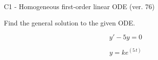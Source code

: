 \begin{exercise}
  \begin{exerciseTitle}C1 - Homogeneous first-order linear ODE (ver. 76)\end{exerciseTitle}
  \begin{exerciseStatement}
    
Find the general solution to the given ODE.

    
\[y'-5y=0\]

  \end{exerciseStatement}
  \begin{exerciseAnswer}
    
\[y= k e^{\left(5 \, t\right)}\]

  \end{exerciseAnswer}
\end{exercise}